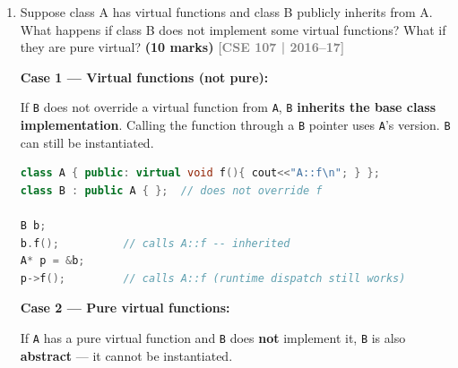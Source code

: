 \documentclass[12pt,a3paper]{article}
\newcommand{\yr}[1]{\hfill\textcolor{gray}{\small\textbf{[#1]}}}
\newcommand{\mk}[1]{\textcolor{orange!70!black}{\small\textbf{(#1 marks)}}}
\begin{document}
\begin{enumerate}
\begin{tcolorbox}[enhanced,breakable,ansbox,colback=cG!4,colframe=cG,
 boxrule=0.8pt,arc=5pt,
 title={\textbf{Answer --- Visibility of Class Members in Inheritance}},
 fonttitle=\bfseries\color{white},colbacktitle=cG]
\begin{lstlisting}[language=C++]
public:
    int pub = 3;
};

class Der : private Base
{
    //    pub -> becomes private in Der (accessible inside Der only)
    //    prot -> becomes private in Der (accessible inside Der only)
    //    priv -> totally inaccessible
public:
    void show()
    {
        cout << "pub: " << pub << "\n";   // OK
        cout << "prot: " << prot << "\n"; // OK
        // cout << priv;                // ERROR: inaccessible
    }
};

int main()
{
    Der d;
    // d.pub = 5;  // ERROR: pub is private via private inheritance
    d.show(); // OK: show() is a public function in Der
    return 0;
}
\end{lstlisting}

\end{tcolorbox}

\item Suppose class A has virtual functions and class B publicly inherits from A. What happens if class B does not implement some virtual functions? What if they are pure virtual? \mk{10}
\yr{CSE 107 | 2016--17}

\begin{tcolorbox}[enhanced,breakable,ansbox,colback=cG!4,colframe=cG,
  boxrule=0.8pt,arc=5pt,
  title={\textbf{Answer --- B inherits A (virtual); what if B doesn't implement some virtual functions?}},
  fonttitle=\bfseries\color{white},colbacktitle=cG]

\textbf{Case 1 --- Virtual functions (not pure):}

If \texttt{B} does not override a virtual function from \texttt{A},
\texttt{B} \textbf{inherits the base class implementation}.  Calling
the function through a \texttt{B} pointer uses \texttt{A}'s version.
\texttt{B} can still be instantiated.

\begin{lstlisting}[language=C++]
class A { public: virtual void f(){ cout<<"A::f\n"; } };
class B : public A { };  // does not override f

B b;
b.f();          // calls A::f -- inherited
A* p = &b;
p->f();         // calls A::f (runtime dispatch still works)
\end{lstlisting}

\textbf{Case 2 --- Pure virtual functions:}

If \texttt{A} has a pure virtual function and \texttt{B} does
\textbf{not} implement it, \texttt{B} is also \textbf{abstract}
--- it cannot be instantiated.


\end{tcolorbox}
\end{enumerate}
\end{document}
